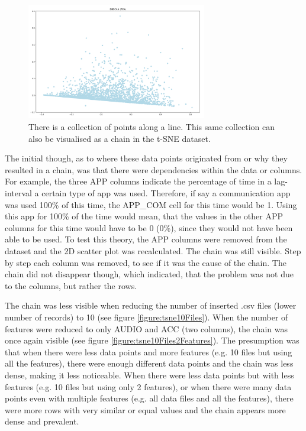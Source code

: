 \begin{figure}[h]
  \centering
  \includegraphics[width=0.7\textwidth]{./images/pcaChain.png}
  \caption{There is a collection of points along a line. This same collection can also be visualised as a chain in the t-SNE dataset.}
  \label{figure:pcaChain}
\end{figure}

The initial though, as to where these data points originated from or why they resulted in a chain, was that there were dependencies within the data or columns. For example, the three APP columns indicate the percentage of time in a lag-interval a certain type of app was used. Therefore, if say a communication app was used 100\% of this time, the APP\_COM cell for this time would be 1. Using this app for 100\% of the time would mean, that the values in the other APP columns for this time would have to be 0 (0\%), since they would not have been able to be used. To test this theory, the APP columns were removed from the dataset and the 2D scatter plot was recalculated. The chain was still visible. Step by step each column was removed, to see if it was the cause of the chain. The chain did not disappear though, which indicated, that the problem was not due to the columns, but rather the rows. 

The chain was less visible when reducing the number of inserted .csv files (lower number of records) to 10 (see figure \ref{figure:tsne10Files}). When the number of features were reduced to only AUDIO and ACC (two columns), the chain was once again visible (see figure \ref{figure:tsne10Files2Features}). The presumption was that when there were less data points and more features (e.g. 10 files but using all the features), there were enough different data points and the chain was less dense, making it less noticeable. When there were less data points but with less features (e.g. 10 files but using only 2 features), or when there were many data points even with multiple features (e.g. all data files and all the features), there were more rows with very similar or equal values and the chain appears more dense and prevalent.

